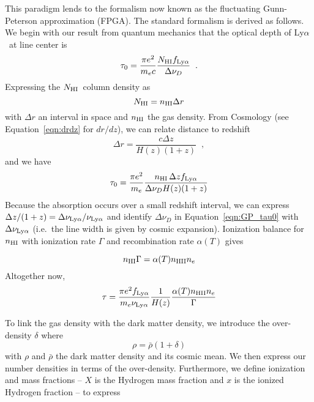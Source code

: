 \documentclass[graybox]{svmult}
\def\lya{Ly$\alpha$}
\newcommand{\mnhi}{N_{\rm HI}}
\newcommand{\nhi}{$\mnhi$}
\begin{document}
This paradigm lends to the formalism now known as the
fluctuating Gunn-Peterson approximation (FPGA).  The
standard formalism is derived as follows.
We begin with our result from quantum mechanics
that the  optical depth of \lya\ at line center is
\begin{equation}
\tau_0 = \frac{\pi e^2}{m_e c} \frac{N_{\rm HI} 
f_{\rm Ly\alpha}}{\Delta \nu_D} \;\; .
\end{equation}
Expressing the  \nhi\ column density as
\begin{equation}
\mnhi = n_{\rm HI} \Delta r
\end{equation}
with $\Delta r$ an interval in space and $n_{\rm HI}$
the gas density.
From Cosmology (see Equation~\ref{eqn:drdz} for $dr/dz$),
we can relate distance to redshift
\begin{equation}
\Delta r = \frac{c \Delta z}{H(z) (1+z)} \;\; ,
\end{equation}
and we have 
\begin{equation}
\tau_0 = \frac{\pi e^2}{m_e} \frac{n_{\rm HI} \, \Delta z
f_{\rm Ly\alpha}}{\Delta \nu_D H(z) (1+z)}
\label{eqn:GP_tau0}
\end{equation}
Because the absorption occurs over a small redshift interval,
we can express
$\Delta z/(1+z) = \Delta\nu_{\rm Ly\alpha} / \nu_{\rm Ly\alpha}$
and identify $\Delta \nu_D$ in Equation~\ref{eqn:GP_tau0}
with $\Delta \nu_{\rm Ly\alpha}$
(i.e.\ the line width is given by cosmic expansion).
Ionization balance for $n_{\rm HI}$ with ionization rate $\Gamma$
and recombination rate $\alpha(T)$ gives

\begin{equation}
n_{\rm HI} \Gamma = \alpha(T) n_{\rm HII} n_e
\label{eqn:ion_balance}
\end{equation}
Altogether now,
\begin{equation}
\tau = \frac{\pi e^2 f_{\rm Ly\alpha}}{m_e \nu_{\rm Ly\alpha}}
\frac{1}{H(z)} \frac{\alpha(T) n_{\rm HII} n_e}{\Gamma}
\end{equation}

To link the gas density with the dark
matter density, we introduce the over-density $\delta$
where
\begin{equation}
\rho = \bar\rho (1+\delta)
\label{eqn:overdensity}
\end{equation}
with $\rho$ and $\bar\rho$ the dark matter
density and its cosmic mean.
We then express our number densities in terms of the over-density.
Furthermore, we define
ionization and mass fractions  -- $X$ is the Hydrogen mass fraction 
and $x$ is the ionized Hydrogen fraction -- to express 
\end{document}
